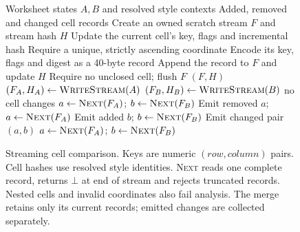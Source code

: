 \begin{figure}[t]
\footnotesize
\begin{algorithmic}[1]
\Require Worksheet states $A,B$ and resolved style contexts
\Ensure Added, removed and changed cell records
  \State Create an owned scratch stream $F$ and stream hash $H$
    \State Update the current cell's key, flags and incremental hash
      \State Require a unique, strictly ascending coordinate
      \State Encode its key, flags and digest as a 40-byte record
      \State Append the record to $F$ and update $H$
    \EndIf
  \EndFor
  \State Require no unclosed cell; flush $F$
  \State \Return $(F,H)$
\EndFunction
\State $(F_A,H_A) \gets \Call{WriteStream}{A}$
\State $(F_B,H_B) \gets \Call{WriteStream}{B}$
  \State \Return no cell changes
\EndIf
\State $a \gets \Call{Next}{F_A}$; $b \gets \Call{Next}{F_B}$
    \State Emit removed $a$; $a \gets \Call{Next}{F_A}$
    \State Emit added $b$; $b \gets \Call{Next}{F_B}$
  \Else
      \State Emit changed pair $(a,b)$
    \EndIf
    \State $a \gets \Call{Next}{F_A}$; $b \gets \Call{Next}{F_B}$
  \EndIf
\EndWhile
\end{algorithmic}
\caption{Streaming cell comparison. Keys are numeric $(row,column)$ pairs.
Cell hashes use resolved style identities. \textsc{Next} reads one complete
record, returns $\bot$ at end of stream and rejects truncated records.
Nested cells and invalid coordinates also fail analysis. The merge retains
only its current records; emitted changes are collected separately.}
\label{fig:cell-record}
\end{figure}
